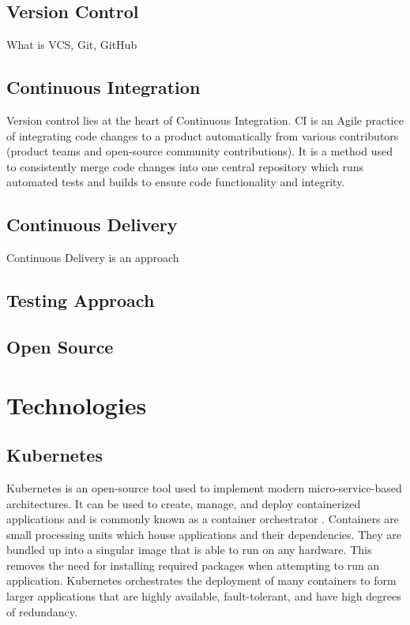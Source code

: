 \documentclass{article}
\begin{document}
\subsection{Version Control} \label{version-ctrl}
What is VCS, Git, GitHub 



\subsection{Continuous Integration} \label{ci}
Version control lies at the heart of Continuous Integration. CI is an Agile practice of integrating code changes to a product automatically from various contributors (product teams and open-source community contributions). It is a method used to consistently merge code changes into one central repository which runs automated tests and builds to ensure code functionality and integrity.   


 
\subsection{Continuous Delivery} \label{cd}
Continuous Delivery is an approach 



\subsection{Testing Approach}



\subsection{Open Source} \label{open-source}



\section{Technologies} \label{technologies} 



\subsection{Kubernetes}

Kubernetes is an open-source tool used to implement modern micro-service-based architectures. It can be used to create, manage, and deploy containerized applications and is commonly known as a container orchestrator \cite{k8s-overview}. Containers are small processing units which house applications and their dependencies. They are bundled up into a singular image that is able to run on any hardware. This removes the need for installing required packages when attempting to run an application. Kubernetes orchestrates the deployment of many containers to form larger applications that are highly available, fault-tolerant, and have high degrees of redundancy.
\end{document}
